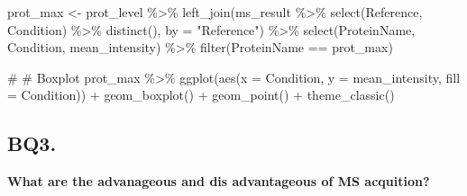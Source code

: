 \documentclass[
  letterpaper,
  DIV=11,
  numbers=noendperiod]{scrartcl}
\newenvironment{Shaded}{\begin{snugshade}}{\end{snugshade}}
\newcommand{\AttributeTok}[1]{\textcolor[rgb]{0.40,0.45,0.13}{#1}}
\newcommand{\CommentTok}[1]{\textcolor[rgb]{0.37,0.37,0.37}{#1}}
\newcommand{\FunctionTok}[1]{\textcolor[rgb]{0.28,0.35,0.67}{#1}}
\newcommand{\NormalTok}[1]{\textcolor[rgb]{0.00,0.23,0.31}{#1}}
\newcommand{\OtherTok}[1]{\textcolor[rgb]{0.00,0.23,0.31}{#1}}
\newcommand{\SpecialCharTok}[1]{\textcolor[rgb]{0.37,0.37,0.37}{#1}}
\newcommand{\StringTok}[1]{\textcolor[rgb]{0.13,0.47,0.30}{#1}}
\begin{document}
\begin{Shaded}
\begin{Highlighting}[]
\NormalTok{prot\_max }\OtherTok{\textless{}{-}}\NormalTok{ prot\_level }\SpecialCharTok{\%\textgreater{}\%} 
    \FunctionTok{left\_join}\NormalTok{(ms\_result }\SpecialCharTok{\%\textgreater{}\%} \FunctionTok{select}\NormalTok{(Reference, Condition) }\SpecialCharTok{\%\textgreater{}\%} \FunctionTok{distinct}\NormalTok{(), }\AttributeTok{by =} \StringTok{"Reference"}\NormalTok{) }\SpecialCharTok{\%\textgreater{}\%}
    \FunctionTok{select}\NormalTok{(ProteinName, Condition, mean\_intensity) }\SpecialCharTok{\%\textgreater{}\%}
    \FunctionTok{filter}\NormalTok{(ProteinName }\SpecialCharTok{==}\NormalTok{ prot\_max)}

\CommentTok{\# \# Boxplot}
\NormalTok{prot\_max }\SpecialCharTok{\%\textgreater{}\%} 
  \FunctionTok{ggplot}\NormalTok{(}\FunctionTok{aes}\NormalTok{(}\AttributeTok{x =}\NormalTok{ Condition, }\AttributeTok{y =}\NormalTok{ mean\_intensity, }\AttributeTok{fill =}\NormalTok{ Condition)) }\SpecialCharTok{+} 
  \FunctionTok{geom\_boxplot}\NormalTok{() }\SpecialCharTok{+} 
  \FunctionTok{geom\_point}\NormalTok{() }\SpecialCharTok{+} 
  \FunctionTok{theme\_classic}\NormalTok{() }
\end{Highlighting}
\end{Shaded}


\subsection{BQ3.}\label{bq3.}

\textbf{What are the advanageous and dis advantageous of MS acquition?}
\end{document}
